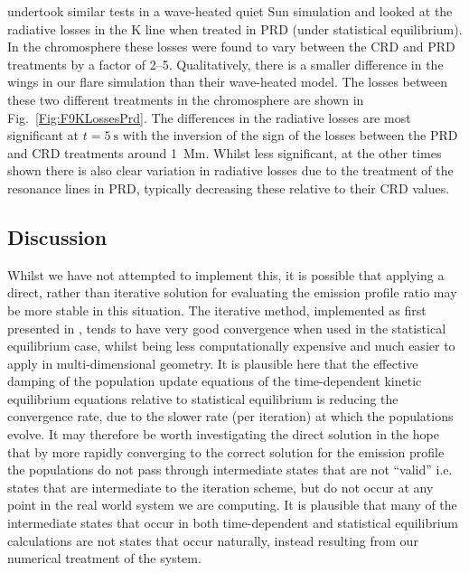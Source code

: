\citet{Uitenbroek2002} undertook similar tests in a wave-heated quiet Sun \Radyn{} simulation and looked at the radiative losses in the \Caii{} K line when treated in PRD (under statistical equilibrium).
In the chromosphere these losses were found to vary between the CRD and PRD treatments by a factor of 2--5.
Qualitatively, there is a smaller difference in the \Caii{} wings in our flare simulation than their wave-heated model.
The losses between these two different treatments in the chromosphere are shown in Fig.~\ref{Fig:F9KLossesPrd}.
The differences in the radiative losses are most significant at $t=\SI{5}{\second}$ with the inversion of the sign of the losses between the PRD and CRD treatments around \SI{1}{\mega\metre}.
Whilst less significant, at the other times shown there is also clear variation in radiative losses due to the treatment of the \Caii{} resonance lines in PRD, typically decreasing these relative to their CRD values.

\subsection{Discussion}

Whilst we have not attempted to implement this, it is possible that applying a direct, rather than iterative solution for evaluating the emission profile ratio may be more stable in this situation.
The iterative method, implemented as first presented in \citet{Uitenbroek2001}, tends to have very good convergence when used in the statistical equilibrium case, whilst being less computationally expensive and much easier to apply in multi-dimensional geometry.
It is plausible here that the effective damping of the population update equations of the time-dependent kinetic equilibrium equations relative to statistical equilibrium is reducing the convergence rate, due to the slower rate (per iteration) at which the populations evolve.
It may therefore be worth investigating the direct solution in the hope that by more rapidly converging to the correct solution for the emission profile the populations do not pass through intermediate states that are not ``valid'' i.e. states that are intermediate to the iteration scheme, but do not occur at any point in the real world system we are computing.
It is plausible that many of the intermediate states that occur in both time-dependent and statistical equilibrium calculations are not states that occur naturally, instead resulting from our numerical treatment of the system.

